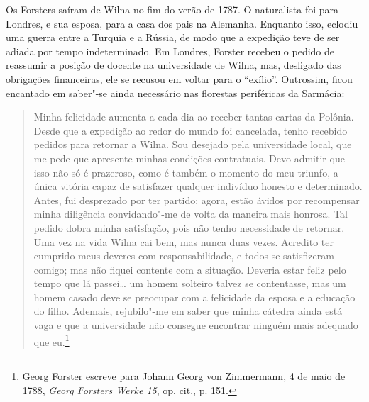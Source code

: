 Os Forsters saíram de Wilna no fim do verão de 1787. O naturalista foi
para Londres, e sua esposa, para a casa dos pais na Alemanha. Enquanto
isso, eclodiu uma guerra entre a Turquia e a Rússia, de modo que a
expedição teve de ser adiada por tempo indeterminado. Em Londres,
Forster recebeu o pedido de reassumir a posição de docente na
universidade de Wilna, mas, desligado das obrigações financeiras, ele se
recusou em voltar para o ``exílio''. Outrossim, ficou encantado em
saber"-se ainda necessário nas florestas periféricas da Sarmácia:

\begin{quote}
Minha felicidade aumenta a cada dia ao receber tantas cartas da Polônia.
Desde que a expedição ao redor do mundo foi cancelada, tenho recebido
pedidos para retornar a Wilna. Sou desejado pela universidade local, que
me pede que apresente minhas condições contratuais. Devo admitir que
isso não só é prazeroso, como é também o momento do meu triunfo, a única
vitória capaz de satisfazer qualquer indivíduo honesto e determinado.
Antes, fui desprezado por ter partido; agora, estão ávidos por
recompensar minha diligência convidando"-me de volta da maneira mais
honrosa. Tal pedido dobra minha satisfação, pois não tenho necessidade
de retornar. Uma vez na vida Wilna cai bem, mas nunca duas vezes.
Acredito ter cumprido meus deveres com responsabilidade, e todos se
satisfizeram comigo; mas não fiquei contente com a situação. Deveria
estar feliz pelo tempo que lá passei\ldots{} um homem solteiro talvez se
contentasse, mas um homem casado deve se preocupar com a felicidade da
esposa e a educação do filho. Ademais, rejubilo"-me em saber que minha
cátedra ainda está vaga e que a universidade não consegue encontrar
ninguém mais adequado que eu.\footnote{Georg Forster escreve para Johann
  Georg von Zimmermann, 4 de maio de 1788, \emph{Georg Forsters Werke
  15}, op. cit., p. 151.}
\end{quote}

%

